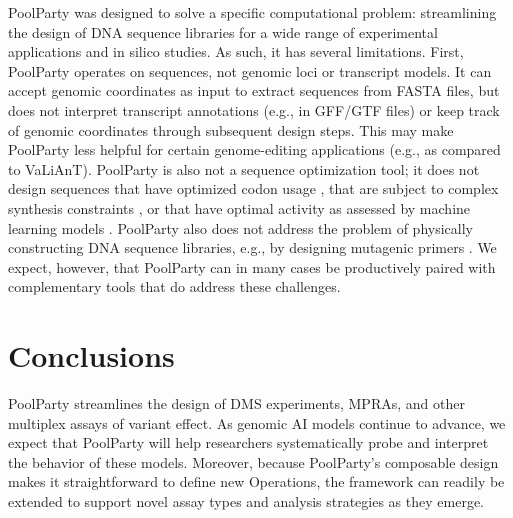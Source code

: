 \documentclass[pdflatex,sn-vancouver-num,referee,oneside]{sn-jnl}
\newif\ifshowquoted
\newcommand{\quoted}[1]{\ifshowquoted\textcolor{quotedtext}{#1}\else#1\fi}
\begin{document}
\quoted{PoolParty was designed to solve a specific computational problem: streamlining the design of DNA sequence libraries for a wide range of experimental applications and in silico studies. As such, it has several limitations. First, PoolParty operates on sequences, not genomic loci or transcript models. It can accept genomic coordinates as input to extract sequences from FASTA files, but does not interpret transcript annotations (e.g., in GFF/GTF files) or keep track of genomic coordinates through subsequent design steps. This may make PoolParty less helpful for certain genome-editing applications (e.g., as compared to VaLiAnT). PoolParty is also not a sequence optimization tool; it does not design sequences that have optimized codon usage \citep{Swainston2017rb}, that are subject to complex synthesis constraints \citep{Zulkower2020jk}, or that have optimal activity as assessed by machine learning models \citep{Schreiber2025ledidi}. PoolParty also does not address the problem of physically constructing DNA sequence libraries, e.g., by designing mutagenic primers \citep{Hiraga2021yg}. We expect, however, that PoolParty can in many cases be productively paired with complementary tools that do address these challenges.}

\section*{Conclusions}\label{sec:conclusions}

PoolParty streamlines the design of DMS experiments, MPRAs, and other multiplex assays of variant effect. As genomic AI models continue to advance, we expect that PoolParty will help researchers systematically probe and interpret the behavior of these models. Moreover, because PoolParty's composable design makes it straightforward to define new Operations, the framework can readily be extended to support novel assay types and analysis strategies as they emerge.

\backmatter
\end{document}
